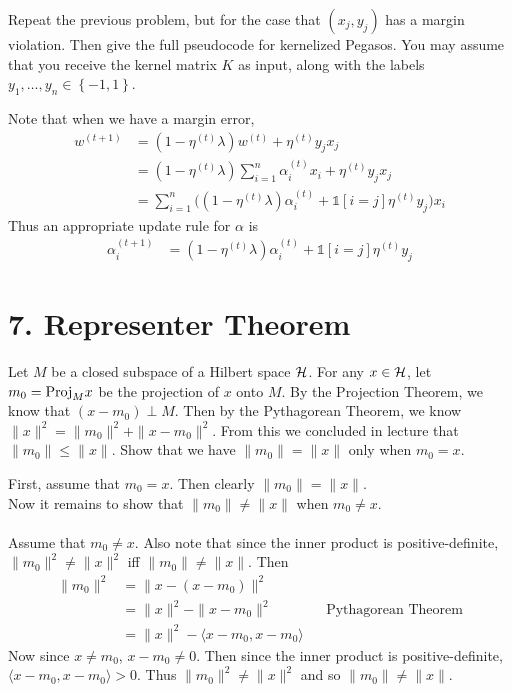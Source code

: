 \documentclass[12pt,letterpaper]{article}
\begin{document}
\begin{problem}{5.3}
Repeat the previous problem, but for the case that $\left(x_{j},y_{j}\right)$
has a margin violation. Then give the full pseudocode for kernelized
Pegasos. You may assume that you receive the kernel matrix $K$ as
input, along with the labels $y_{1},\ldots,y_{n}\in\left\{ -1,1\right\}$.
\end{problem}
\begin{solution}{}
    Note that when we have a margin error,
    \begin{align*}
        w^{(t+1)} &= (1-\eta^{(t)}\lambda)w^{(t)} + \eta^{(t)}y_jx_j\\
        &= (1-\eta^{(t)}\lambda)\sum_{i=1}^{n}\alpha_{i}^{(t)}x_{i} + \eta^{(t)}y_jx_j\\
        &= \sum_{i=1}^{n} \big( (1-\eta^{(t)}\lambda)\alpha_{i}^{(t)} +  \mathds{1}[i=j]\eta^{(t)}y_j \big) x_i
    \end{align*}
    Thus an appropriate update rule for $\alpha$ is 
    \begin{align*}
        \alpha_i^{(t+1)} &= (1-\eta^{(t)}\lambda)\alpha_{i}^{(t)} +  \mathds{1}[i=j]\eta^{(t)}y_j
    \end{align*}
\end{solution}
\newpage

\section{7. Representer Theorem}
\begin{problem}{7.1}
Let $M$ be a closed subspace of a Hilbert space $\mathcal{H}$. For any $x\in\mathcal{H}$,
let $m_{0}=\text{Proj}_{M}x$ be the projection of $x$ onto $M$. By the
Projection Theorem, we know that $(x-m_{0})\perp M$. Then by the
Pythagorean Theorem, we know $\|x\|^{2}=\|m_{0}\|^{2}+\|x-m_{0}\|^{2}$.
From this we concluded in lecture that $\|m_{0}\|\le\|x\|$. Show
that we have $\|m_{0}\|=\|x\|$ only when $m_{0}=x$.
\end{problem}
\begin{solution}{}
    First, assume that $m_0=x$. Then clearly $\|m_{0}\|=\|x\|$.\\
    Now it remains to show that $\|m_{0}\|\neq\|x\|$ when $m_0\neq x$.\\
    \\
    Assume that $m_0\neq x$. Also note that since the inner product is positive-definite,\\ $\|m_0\|^2 \neq \|x\|^2$ iff $\|m_0\| \neq \|x\|$.
    Then
    \begin{align*}
        \|m_0\|^2 &= \|x-(x-m_0)\|^2\\
        &= \|x\|^2 - \|x-m_0\|^2 && \text{Pythagorean Theorem}\\
        &= \|x\|^2 - \langle x-m_0,x-m_0\rangle
    \end{align*}
    Now since $x\neq m_0$, $x-m_0\neq 0$. Then since the inner product is positive-definite,\\ $\langle x-m_0,x-m_0\rangle > 0$.
    Thus $\|m_0\|^2 \neq \|x\|^2$ and so $\|m_0\| \neq \|x\|$.
\end{solution}
\newpage
\end{document}
